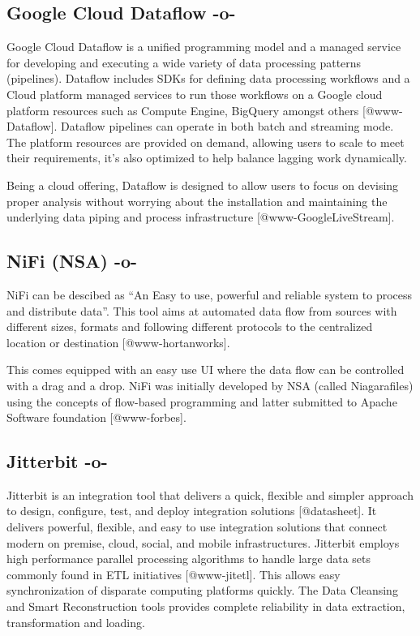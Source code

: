 \subsection{Google Cloud Dataflow -o-}
    
Google Cloud Dataflow is a unified programming model and a managed
service for developing and executing a wide variety of data processing
patterns (pipelines). Dataflow includes SDKs for defining data
processing workflows and a Cloud platform managed services to run
those workflows on a Google cloud platform resources such as Compute
Engine, BigQuery amongst others [@www-Dataflow]. Dataflow
pipelines can operate in both batch and streaming mode. The platform
resources are provided on demand, allowing users to scale to meet
their requirements, it's also optimized to help balance lagging work
dynamically.

Being a cloud offering, Dataflow is designed to allow users to focus
on devising proper analysis without worrying about the installation
and maintaining the underlying data piping and process
infrastructure [@www-GoogleLiveStream].


    
\subsection{NiFi (NSA) -o-}

NiFi can be descibed as ``An Easy to use, powerful and reliable system
to process and distribute data''\cite{www-nifi}.  This tool aims at
automated data flow from sources with different sizes, formats and
following different protocols to the centralized location or
destination [@www-hortanworks].
    
This comes equipped with an easy use UI where the data flow can be
controlled with a drag and a drop.  NiFi was initially developed by
NSA (called Niagarafiles) using the concepts of flow-based programming
and latter submitted to Apache Software foundation [@www-forbes].

\subsection{Jitterbit -o-}

Jitterbit is an integration tool that delivers a quick, flexible and
simpler approach to design, configure, test, and deploy integration
solutions [@datasheet].  It delivers powerful, flexible, and easy
to use integration solutions that connect modern on premise, cloud,
social, and mobile infrastructures. Jitterbit employs high performance
parallel processing algorithms to handle large data sets commonly
found in ETL initiatives [@www-jitetl]. This allows easy
synchronization of disparate computing platforms quickly. The Data
Cleansing and Smart Reconstruction tools provides complete reliability
in data extraction, transformation and loading.

